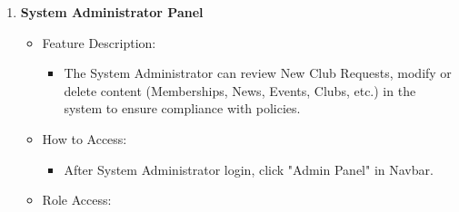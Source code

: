 \begin{enumerate}
      \begin{itemize}
      \item
        Feature Description:
    
        \begin{itemize}
        \item
          Users can request to create new clubs. Admins can approve or
          reject applications.
        \end{itemize}
      \item
        How to Access:
    
        \begin{itemize}
        \item
          "Create Club" button on the bottom of club list page, "admin panel
          - requests" for review.
        \end{itemize}
      \item
        Role Access:
    
        \begin{itemize}
        \item
          Users can apply. Admins can approve/reject.
        \end{itemize}
      \item
        Business Goal:
    
        \begin{itemize}
        \item
          Clarifies structure and responsibilities within clubs.
        \end{itemize}
      \end{itemize}
    \item
      \textbf{System Administrator Panel}
    
      \begin{itemize}
      \item
        Feature Description:
    
        \begin{itemize}
        \item
          The System Administrator can review New Club Requests, modify or
          delete content (Memberships, News, Events, Clubs, etc.) in the
          system to ensure compliance with policies.
        \end{itemize}
      \item
        How to Access:
    
        \begin{itemize}
        \item
          After System Administrator login, click "Admin Panel" in Navbar.
        \end{itemize}
      \item
        Role Access:
    

\end{itemize}
\end{enumerate}
